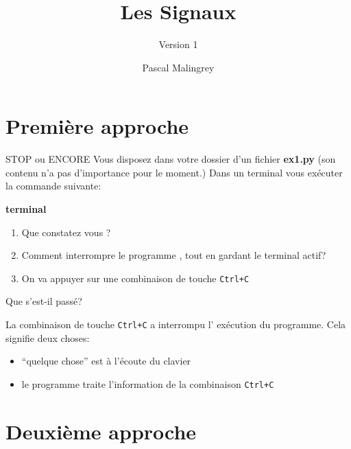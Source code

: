 \documentclass[9pt]{beamer}
\title{Les Signaux}
\subtitle{Version 1}
\author{Pascal Malingrey}
\institute{Académie Strasbourg}
\newenvironment{code}[1]{%
    \begin{bclogo}[couleur=backcolour, couleurTexte=black ,couleurBord=bleulapis ,couleurBarre=black, ombre=false,epBord=0.9,logo=\#,arrondi=0.1]{{\bfseries #1}}%
    }%
    {%
    \end{bclogo}
}%
\begin{document}
\maketitle

\section{Première approche}

 {}

\begin{frame}{STOP ou ENCORE}
Vous disposez dans votre dossier d'un fichier \textbf{ex1.py} (son contenu n'a pas d'importance pour le moment.)
Dans un terminal vous exécuter la commande suivante:

\begin{code}{terminal}
 \parbox{6cm}{\exe}
\end{code}

\begin{enumerate}[<+->]
\item Que constatez vous ?
\item Comment interrompre le programme , tout en gardant le terminal actif?
\item On va appuyer sur une combinaison de touche \texttt{Ctrl+C}
\end{enumerate}

\end{frame}

\begin{frame}{Que s'est-il passé?}

La combinaison de touche \texttt{Ctrl+C} a interrompu l' exécution du programme.
Cela signifie deux choses:

\begin{itemize}
\item ``quelque chose'' est à l'écoute du clavier
\item le programme traite l'information de la combinaison \texttt{Ctrl+C}
\end{itemize}

\end{frame}
\section{Deuxième approche}
\end{document}
